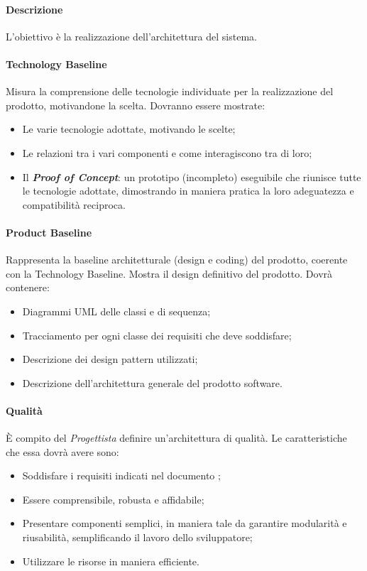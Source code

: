 \paragraph{Descrizione}
L’obiettivo è la realizzazione dell’architettura del sistema.

\paragraph{Technology Baseline}
Misura la comprensione delle tecnologie individuate per la realizzazione del prodotto, motivandone la scelta. 
Dovranno essere mostrate:
\begin{itemize}
	\item Le varie tecnologie adottate, motivando le scelte;
	\item Le relazioni tra i vari componenti e come interagiscono tra di loro;
	\item Il \textit{\textbf{Proof of Concept}}: un prototipo (incompleto) eseguibile che riunisce tutte le tecnologie adottate, dimostrando in maniera pratica la loro adeguatezza e compatibilità reciproca. 
\end{itemize}

\paragraph{Product Baseline}
Rappresenta la baseline architetturale (design e coding) del prodotto, coerente con la Technology Baseline. Mostra il design definitivo del prodotto.
Dovrà contenere:
\begin{itemize}
	\item Diagrammi UML delle classi e di sequenza;
	\item Tracciamento per ogni classe dei requisiti che deve soddisfare;
	\item Descrizione dei design pattern utilizzati;
	\item Descrizione dell'architettura generale del prodotto software.
\end{itemize}

\paragraph{Qualità}
È compito del \textit{Progettista} definire un'architettura di qualità. Le caratteristiche che essa dovrà avere sono:

\begin{itemize}
  \item Soddisfare i requisiti indicati nel documento \AdR;
  \item Essere comprensibile, robusta e affidabile;
  \item Presentare componenti semplici, in maniera tale da garantire modularità e riusabilità, semplificando il lavoro dello sviluppatore;  
  \item Utilizzare le risorse in maniera efficiente.
\end{itemize}


